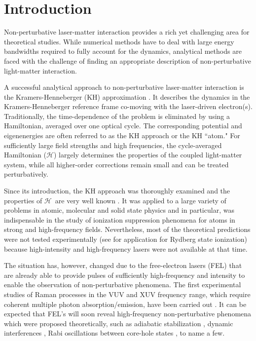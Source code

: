 \documentclass[
pra%
,preprint%
,amssymb, nobibnotes, aps, superscriptaddress, floatfix]{revtex4}
\newcommand{\CAH}{$\mathcal{H}$}
\begin{document}
\maketitle

%
%
%

\section{Introduction}

Non-perturbative laser-matter interaction provides a rich yet challenging area for theoretical studies. While numerical methods have to deal with large energy bandwidths required to fully account for the dynamics, analytical methods are faced with the challenge of finding an appropriate description of non-perturbative light-matter interaction.

A successful analytical approach to non-perturbative laser-matter interaction is the Kramers-Henneberger (KH) approximation \cite{Henneberger1968a,Gersten1974}. It describes the dynamics in the Kramers-Henneberger reference frame co-moving with the laser-driven electron(s). Traditionally, the time-dependence of the problem is eliminated by using a Hamiltonian, averaged over one optical cycle. The corresponding potential and eigenenergies are often referred to as the KH approach or the KH ``atom." For sufficiently large field strengths and high frequencies, the cycle-averaged Hamiltonian (\CAH) largely determines the properties of the coupled light-matter system, while all higher-order corrections remain small and can be treated perturbatively. 

Since its introduction, the KH approach was thoroughly examined and the properties of \CAH\ are very well known \cite{Gavrila2002, Popov2003}. It was applied to a large variety of problems in atomic, molecular \cite{Pont1988} and solid state physics \cite{Niculescu2008,Lima2008} and in particular, was indispensable in the study of ionization suppression phenomena for atoms in strong and high-frequency fields. Nevertheless, most of the theoretical predictions were not tested experimentally (see \cite{VanDruten1997,DeBoer1993,DeBoer1994} for application for Rydberg state ionization) because high-intensity and high-frequency lasers were not available at that time.

The situation has, however, changed due to the free-electron lasers (FEL) \cite{McNeil2010} that are already able to provide pulses of sufficiently high-frequency and intensity to enable the observation of non-perturbative phenomena. The first experimental studies of Raman processes in the VUV and XUV frequency range, which require coherent multiple photon absorption/emission, have been carried out \cite{Weninger2013}. It can be expected that FEL’s will soon reveal high-frequency non-perturbative phenomena which were proposed theoretically, such as adiabatic stabilization \cite{Gavrila2002}, dynamic interferences \cite{Toyota2008,Toyota2007,Tolstikhin2008,Demekhin2012,Baghery2017}, Rabi oscillations between core-hole states \cite{Demekhin2011}, to name a few.
\end{document}
